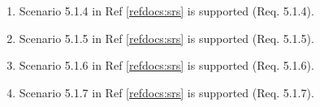 \documentclass[a4paper]{article}
\newlength{\testlabellength}
\newenvironment{testlist}{\begin{enumerate}[label=\bfseries Instruction \thesubsection.\arabic* , labelindent=0pt, labelwidth=\testlabellength , leftmargin=2cm]}{\end{enumerate}}
\newenvironment{precondition}{
{\color{white}BLARG}\\ 
\textbf{Precondition}
\begin{itemize}[labelindent=0cm, labelwidth=2cm , leftmargin=1cm]
}
{\end{itemize}}
\newenvironment{instruction}{
\textbf{Instructions:}
\begin{enumerate}[label=\bfseries  \arabic*., labelindent=0cm, labelwidth=2cm , leftmargin=1cm]
}
{\end{enumerate}}
\newenvironment{postcondition}{
\textbf{Postcondition:}
\begin{itemize}[labelindent=0cm, labelwidth=2cm , leftmargin=1cm]
}
{\end{itemize}}
\begin{document}
\begin{appendices}
\begin{testlist}
	\item Scenario 5.1.4 in Ref \ref{refdocs:srs} is supported (Req. 5.1.4).

	\item Scenario 5.1.5 in Ref \ref{refdocs:srs} is supported (Req. 5.1.5).

	\item Scenario 5.1.6 in Ref \ref{refdocs:srs} is supported (Req. 5.1.6).

	\item Scenario 5.1.7 in Ref \ref{refdocs:srs} is supported (Req. 5.1.7).


\end{testlist}
\end{appendices}
\end{document}
